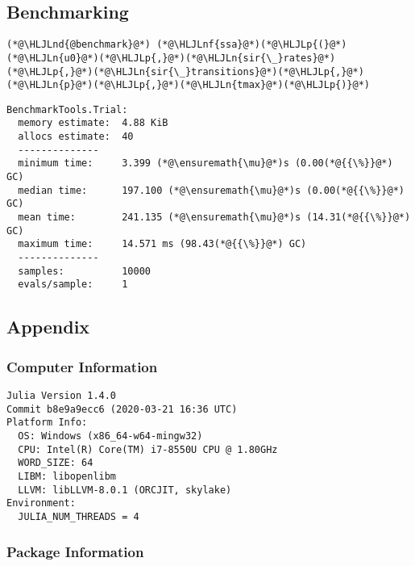 \documentclass[12pt,a4paper]{article}
\newcommand{\HLJLn}[1]{#1}
\newcommand{\HLJLnd}[1]{\textcolor[RGB]{214,102,97}{#1}}
\newcommand{\HLJLnf}[1]{\textcolor[RGB]{66,102,213}{#1}}
\newcommand{\HLJLp}[1]{#1}
\begin{document}
\subsection{Benchmarking}

\begin{lstlisting}
(*@\HLJLnd{@benchmark}@*) (*@\HLJLnf{ssa}@*)(*@\HLJLp{(}@*)(*@\HLJLn{u0}@*)(*@\HLJLp{,}@*)(*@\HLJLn{sir{\_}rates}@*)(*@\HLJLp{,}@*)(*@\HLJLn{sir{\_}transitions}@*)(*@\HLJLp{,}@*)(*@\HLJLn{p}@*)(*@\HLJLp{,}@*)(*@\HLJLn{tmax}@*)(*@\HLJLp{)}@*)
\end{lstlisting}

\begin{lstlisting}
BenchmarkTools.Trial: 
  memory estimate:  4.88 KiB
  allocs estimate:  40
  --------------
  minimum time:     3.399 (*@\ensuremath{\mu}@*)s (0.00(*@{{\%}}@*) GC)
  median time:      197.100 (*@\ensuremath{\mu}@*)s (0.00(*@{{\%}}@*) GC)
  mean time:        241.135 (*@\ensuremath{\mu}@*)s (14.31(*@{{\%}}@*) GC)
  maximum time:     14.571 ms (98.43(*@{{\%}}@*) GC)
  --------------
  samples:          10000
  evals/sample:     1
\end{lstlisting}



\subsection{Appendix}

\subsubsection{Computer Information}

\begin{verbatim}
Julia Version 1.4.0
Commit b8e9a9ecc6 (2020-03-21 16:36 UTC)
Platform Info:
  OS: Windows (x86_64-w64-mingw32)
  CPU: Intel(R) Core(TM) i7-8550U CPU @ 1.80GHz
  WORD_SIZE: 64
  LIBM: libopenlibm
  LLVM: libLLVM-8.0.1 (ORCJIT, skylake)
Environment:
  JULIA_NUM_THREADS = 4

\end{verbatim}

\subsubsection{Package Information}
\end{document}
